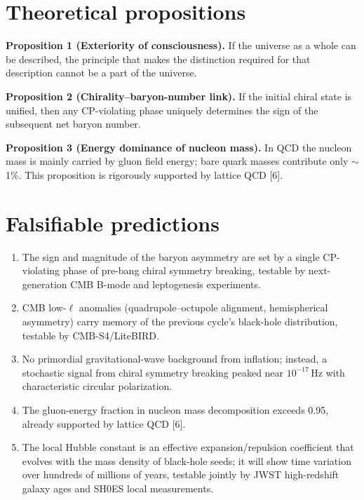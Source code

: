 \documentclass[11pt,a4paper]{article}
\begin{document}
\section{Theoretical propositions}

\textbf{Proposition 1 (Exteriority of consciousness).} If the universe as a whole can be described, the principle that makes the distinction required for that description cannot be a part of the universe.

\textbf{Proposition 2 (Chirality--baryon-number link).} If the initial chiral state is unified, then any CP-violating phase uniquely determines the sign of the subsequent net baryon number.

\textbf{Proposition 3 (Energy dominance of nucleon mass).} In QCD the nucleon mass is mainly carried by gluon field energy; bare quark masses contribute only $\sim$1\%. This proposition is rigorously supported by lattice QCD [6].

\section{Falsifiable predictions}
\begin{enumerate}
\item[P1.] The sign and magnitude of the baryon asymmetry are set by a single CP-violating phase of pre-bang chiral symmetry breaking, testable by next-generation CMB B-mode and leptogenesis experiments.
\item[P2.] CMB low-$\ell$ anomalies (quadrupole--octupole alignment, hemispherical asymmetry) carry memory of the previous cycle's black-hole distribution, testable by CMB-S4/LiteBIRD.
\item[P3.] No primordial gravitational-wave background from inflation; instead, a stochastic signal from chiral symmetry breaking peaked near $10^{-17}$\,Hz with characteristic circular polarization.
\item[P4.] The gluon-energy fraction in nucleon mass decomposition exceeds 0.95, already supported by lattice QCD [6].
\item[P5.] The local Hubble constant is an effective expansion/repulsion coefficient that evolves with the mass density of black-hole seeds; it will show time variation over hundreds of millions of years, testable jointly by JWST high-redshift galaxy ages and SH0ES local measurements.
\end{enumerate}
\end{document}
